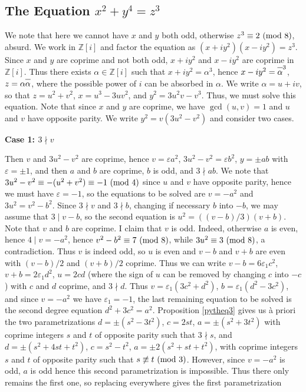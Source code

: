 \documentclass[12pt,a4paper]{article}
\newcommand{\ov}[1]{\overline{\vphantom{T}#1}}
\newcommand{\Z}{{\mathbb Z}}
\newcommand{\al}{\alpha}
\newcommand{\eps}{\varepsilon}
\renewcommand{\pmod}[1]{\allowbreak\ ({\rm{mod}}\,\,#1)}
\begin{document}
\subsection{The Equation $x^2+y^4=z^3$}\label{sec234p}

We note that here we cannot have $x$ and $y$ both odd, otherwise 
$z^3\equiv2\pmod8$, absurd. We work in $\Z[i]$ and factor the equation as 
$(x+iy^2)(x-iy^2)=z^3$. Since $x$ and $y$ are coprime and not both odd, 
$x+iy^2$ and $x-iy^2$ are coprime in $\Z[i]$. Thus there exists $\al\in \Z[i]$
such that $x+iy^2=\al^3$, hence $x-iy^2=\ov{\al}^3$, $z=\al\ov{\al}$, where the
possible power of $i$ can be absorbed in $\al$. We write $\al=u+iv$, so that
$z=u^2+v^2$, $x=u^3-3uv^2$, and $y^2=3u^2v-v^3$. Thus, we must solve this 
equation. Note that since $x$ and $y$ are coprime, we have $\gcd(u,v)=1$
and $u$ and $v$ have opposite parity. We write $y^2=v(3u^2-v^2)$ and
consider two cases.

\smallskip

\noindent
{\bf Case 1: $3\nmid v$}

\smallskip

Then $v$ and $3u^2-v^2$ are coprime, hence $v=\eps a^2$, $3u^2-v^2=\eps b^2$,
$y=\pm ab$ with $\eps=\pm1$, and then $a$ and $b$ are coprime, $b$ is odd,
and $3\nmid ab$. We note that $3u^2-v^2\equiv-(u^2+v^2)\equiv-1\pmod4$ since
$u$ and $v$ have opposite parity, hence we must have $\eps=-1$, so the 
equations to be solved are $v=-a^2$ and $3u^2=v^2-b^2$. Since $3\nmid v$ and 
$3\nmid b$, changing if necessary $b$ into $-b$, we may assume that 
$3\mid v-b$, so the second equation is $u^2=((v-b)/3)(v+b)$. Note that $v$ and
$b$ are coprime. I claim that $v$ is odd. Indeed, otherwise $a$ is even,
hence $4\mid v=-a^2$, hence $v^2-b^2\equiv7\pmod8$, while $3u^2\equiv3\pmod8$,
a contradiction. Thus $v$ is indeed odd, so $u$ is even and $v-b$ and $v+b$
are even with $(v-b)/2$ and $(v+b)/2$ coprime. Thus we can write
$v-b=6\eps_1c^2$, $v+b=2\eps_1d^2$, $u=2cd$ (where the sign of $u$ can be
removed by changing $c$ into $-c$) with $c$ and $d$ coprime, and $3\nmid d$.
Thus $v=\eps_1(3c^2+d^2)$, $b=\eps_1(d^2-3c^2)$, and since $v=-a^2$ we have
$\eps_1=-1$, the last remaining equation to be solved is the second degree 
equation $d^2+3c^2=a^2$. Proposition \ref{pytheq3} gives us \`a priori the two
parametrizations $d=\pm(s^2-3t^2)$, $c=2st$, $a=\pm(s^2+3t^2)$
with coprime integers $s$ and $t$ of opposite parity such that $3\nmid s$,
and $d=\pm(s^2+4st+t^2)$, $c=s^2-t^2$, $a=\pm2(s^2+st+t^2)$, with coprime
integers $s$ and $t$ of opposite parity such that $s\not\equiv t\pmod3$.
However, since $v=-a^2$ is odd, $a$ is odd hence this second parametrization
is impossible. Thus there only remains the first one, so replacing everywhere 
gives the first parametrization
\end{document}
